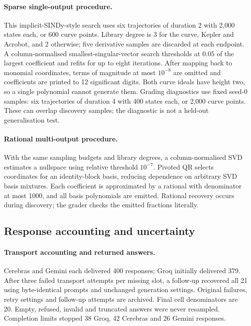 \documentclass[10pt]{article}
\begin{document}
\paragraph{Sparse single-output procedure.} This implicit-SINDy-style search \citep{mangan2016implicit} uses six trajectories of duration 2 with 2,000 states each, or 600 curve points. Library degree is 3 for the curve, Kepler and Acrobot, and 2 otherwise; five derivative samples are discarded at each endpoint. A column-normalised smallest-singular-vector search thresholds at $0.05$ of the largest coefficient and refits for up to eight iterations. After mapping back to monomial coordinates, terms of magnitude at most $10^{-8}$ are omitted and coefficients are printed to 12 significant digits. Both curve ideals have height two, so a single polynomial cannot generate them. Grading diagnostics use fixed seed-0 samples: six trajectories of duration 4 with 400 states each, or 2,000 curve points. These can overlap discovery samples; the diagnostic is not a held-out generalisation test.

\paragraph{Rational multi-output procedure.} With the same sampling budgets and library degrees, a column-normalised SVD estimates a nullspace using relative threshold $10^{-7}$. Pivoted QR selects coordinates for an identity-block basis, reducing dependence on arbitrary SVD basis mixtures. Each coefficient is approximated by a rational with denominator at most 1000, and all basis polynomials are emitted. Rational recovery occurs during discovery; the grader checks the emitted fractions literally.

\subsection{Response accounting and uncertainty}

\paragraph{Transport accounting and returned answers.} Cerebras and Gemini each delivered 400 responses; Groq initially delivered 379. After three failed transport attempts per missing slot, a follow-up recovered all 21 using byte-identical prompts and unchanged generation settings. Original failures, retry settings and follow-up attempts are archived. Final cell denominators are 20. Empty, refused, invalid and truncated answers were never resampled. Completion limits stopped 38 Groq, 42 Cerebras and 26 Gemini responses.
\end{document}
